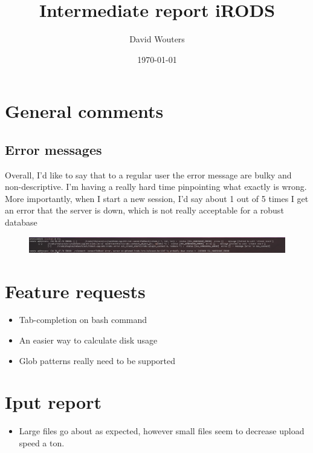 \documentclass[12pt]{article}
\title{Intermediate report iRODS}
\author{David Wouters}
\date{\today}
\begin{document}
\maketitle

\section{General comments}
\subsection{Error messages}
Overall, I'd like to say that to a regular user the error message are bulky and non-descriptive. 
I'm having a really hard time pinpointing what exactly is wrong. 
More importantly, when I start a new session, I'd say about 1 out of 5 times I get an error that the server is down, which is not really acceptable for a robust database

\begin{figure}[h!]
        \centering
        \includegraphics[width=\linewidth]{imgs/down_error.png}
\end{figure}

\section{Feature requests}
\begin{itemize}
        \item Tab-completion on bash command
        \item An easier way to calculate disk usage
        \item Glob patterns really need to be supported
\end{itemize}
\section{Iput report}
\begin{itemize}
        \item Large files go about as expected, however small files seem to decrease upload speed a ton.
\end{itemize}

        
\end{document}
